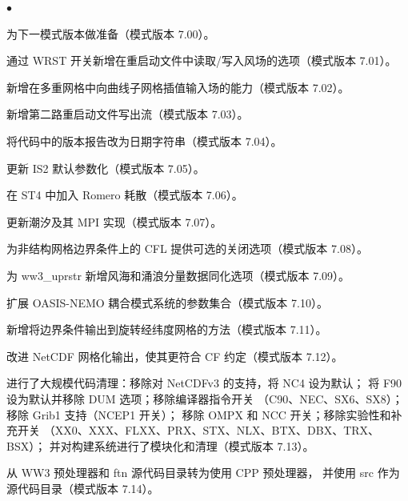 \begin{list}{$\bullet$}{\rightmargin 5mm \parsep 0mm \itemsep 0mm}

\item 为下一模式版本做准备（模式版本 7.00）。

\item 通过 WRST 开关新增在重启动文件中读取/写入风场的选项（模式版本 7.01）。

\item 新增在多重网格中向曲线子网格插值输入场的能力（模式版本 7.02）。

\item 新增第二路重启动文件写出流（模式版本 7.03）。

\item 将代码中的版本报告改为日期字符串（模式版本 7.04）。

\item 更新 IS2 默认参数化（模式版本 7.05）。

\item 在 ST4 中加入 Romero 耗散（模式版本 7.06）。

\item 更新潮汐及其 MPI 实现（模式版本 7.07）。

\item 为非结构网格边界条件上的 CFL 提供可选的关闭选项（模式版本 7.08）。

\item 为 ww3\_uprstr 新增风海和涌浪分量数据同化选项（模式版本 7.09）。

\item 扩展 OASIS-NEMO 耦合模式系统的参数集合（模式版本 7.10）。

\item 新增将边界条件输出到旋转经纬度网格的方法（模式版本 7.11）。

\item 改进 NetCDF 网格化输出，使其更符合 CF 约定（模式版本 7.12）。

\item 进行了大规模代码清理：移除对 NetCDFv3 的支持，将 NC4 设为默认；
      将 F90 设为默认并移除 DUM 选项；移除编译器指令开关
      （C90、NEC、SX6、SX8）；移除 Grib1 支持（NCEP1 开关）；
      移除 OMPX 和 NCC 开关；移除实验性和补充开关
      （XX0、XXX、FLXX、PRX、STX、NLX、BTX、DBX、TRX、BSX）；
      并对构建系统进行了模块化和清理（模式版本 7.13）。

\item 从 WW3 预处理器和 ftn 源代码目录转为使用 CPP 预处理器，
      并使用 src 作为源代码目录（模式版本 7.14）。

\end{list}

